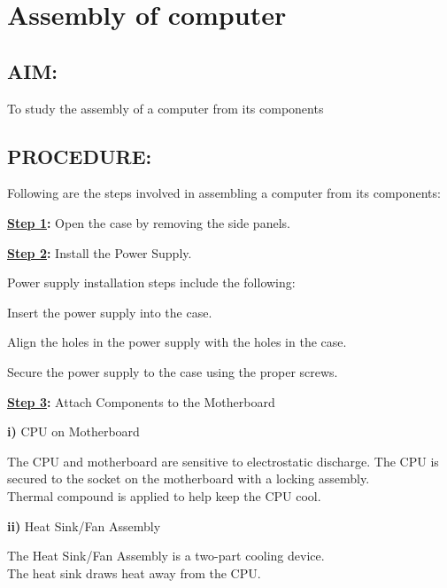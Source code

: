 \documentclass[a4paper,28pt,twoside,openright]{report}
\begin{document}
%
%
%
\chapter{Assembly of computer}
%
%
%
%
\section*{AIM:}
To study the assembly of a computer from its components
\section*{PROCEDURE:}
Following are the steps involved in assembling a computer from its components:

\textbf{\underline{Step 1}:} Open the case by removing the side panels.


\textbf{\underline{Step 2}:} Install the Power Supply.

\hspace{40pt}Power supply installation steps include the following:

\hspace{40pt}Insert the power supply into the case.

\hspace{40pt}Align the holes in the power supply with the holes in the case.

\hspace{40pt}Secure the power supply to the case using the proper screws.


\textbf{\underline{Step 3}:} Attach Components to the Motherboard

\hspace{40pt}\textbf{i)} CPU on Motherboard

\hspace{50pt}The CPU and motherboard are sensitive to electrostatic discharge.
\newline
\hspace*{50pt}The CPU is secured to the socket on the motherboard with a locking assembly.
\\\hspace*{50pt}Thermal compound is applied to help keep the CPU cool.

\hspace{40pt}\textbf{ii)} Heat Sink/Fan Assembly

\hspace{50pt}  The Heat Sink/Fan Assembly is a two-part cooling device.
\\\hspace*{50pt}  The heat sink draws heat away from the CPU.
\end{document}
